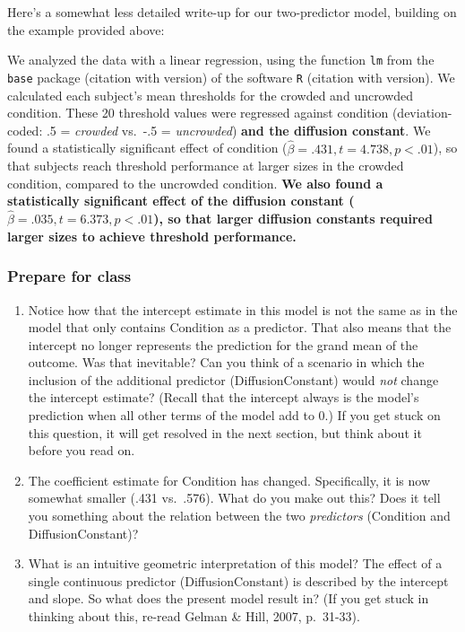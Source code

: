 \documentclass[
]{article}
\providecommand{\tightlist}{%
  \setlength{\itemsep}{0pt}\setlength{\parskip}{0pt}}
\begin{document}
Here's a somewhat less detailed write-up for our two-predictor model,
building on the example provided above:

\color{lightgray}

We analyzed the data with a linear regression, using the function
\texttt{lm} from the \texttt{base} package (citation with version) of
the software \texttt{R} (citation with version). We calculated each
subject's mean thresholds for the crowded and uncrowded condition. These
20 threshold values were regressed against condition (deviation-coded:
.5 = \emph{crowded} vs.~-.5 = \emph{uncrowded}) \textbf{and the
diffusion constant}. We found a statistically significant effect of
condition (\(\widehat{\beta}=.431, t=4.738, p<.01\)), so that subjects
reach threshold performance at larger sizes in the crowded condition,
compared to the uncrowded condition. \textbf{We also found a
statistically significant effect of the diffusion constant
(\(\widehat{\beta}=.035, t=6.373, p<.01\)), so that larger diffusion
constants required larger sizes to achieve threshold performance.}
\color{black}

\hypertarget{prepare-for-class-2}{%
\subsubsection{Prepare for class}\label{prepare-for-class-2}}

\begin{enumerate}
\def\labelenumi{\arabic{enumi}.}
\tightlist
\item
  Notice how that the intercept estimate in this model is not the same
  as in the model that only contains Condition as a predictor. That also
  means that the intercept no longer represents the prediction for the
  grand mean of the outcome. Was that inevitable? Can you think of a
  scenario in which the inclusion of the additional predictor
  (DiffusionConstant) would \emph{not} change the intercept estimate?
  (Recall that the intercept always is the model's prediction when all
  other terms of the model add to 0.) If you get stuck on this question,
  it will get resolved in the next section, but think about it before
  you read on.
\item
  The coefficient estimate for Condition has changed. Specifically, it
  is now somewhat smaller (.431 vs.~.576). What do you make out this?
  Does it tell you something about the relation between the two
  \emph{predictors} (Condition and DiffusionConstant)?
\item
  What is an intuitive geometric interpretation of this model? The
  effect of a single continuous predictor (DiffusionConstant) is
  described by the intercept and slope. So what does the present model
  result in? (If you get stuck in thinking about this, re-read Gelman \&
  Hill, 2007, p.~31-33).
\end{enumerate}
\end{document}
